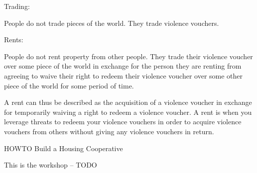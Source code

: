 \documentclass{article}
\begin{document}
\large Trading:

People do not trade pieces of the world. They trade violence vouchers. 

\large Rents:

People do not rent property from other people. They trade their violence voucher over some piece of the world in exchange for the person they are renting from agreeing to waive their right to redeem their violence voucher over some other piece of the world for some period of time.

A rent can thus be described as the acquisition of a violence voucher in exchange for temporarily waiving a right to redeem a violence voucher. A rent is when you leverage threats to redeem your violence vouchers in order to acquire violence vouchers from others without giving any violence vouchers in return.


\pagebreak
\huge HOWTO Build a Housing Cooperative

This is the workshop -- TODO

\vspace{1cm}
\end{document}
